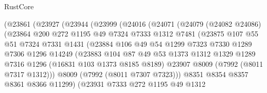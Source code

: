\begin{lexlean}{RustCore}
\begin{coremodule}
                (@23861
                  (@23927
                    (@23944
                      (@23999
                        (@24016
                          (@24071
                            (@24079
                              (@24082 @24086)
                              (@23864
                                @200
                                @272
                                @1195
                                @49
                                @7324
                                @7333
                                @1312
                                @7481
                                (@23875
                                  @107
                                  @55
                                  @51
                                  @7324
                                  @7331
                                  @1431
                                  (@23884
                                    @106
                                    @49
                                    @54
                                    @1299
                                    @7323
                                    @7330
                                    @1289
                                    @7306
                                    @1296
                                    @14249
                                    (@23883
                                      @104
                                      @87
                                      @49
                                      @53
                                      @1373
                                      @1312
                                      @1329
                                      @1289
                                      @7316
                                      @1296
                                      (@16831 @103 @1373 @8185 @8189)
                                      @23907
                                      @8009
                                      (@7992 (@8011 @7317 @1312)))
                                    @8009
                                    (@7992 (@8011 @7307 @7323)))
                                  @8351
                                  @8354
                                  @8357
                                  @8361
                                  @8366
                                  @11299)
                                (@23931
                                  @7333
                                  @272
                                  @1195
                                  @49
                                  @1312

\end{coremodule}
\end{lexlean}
